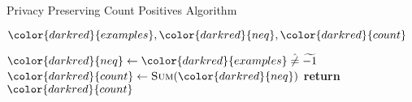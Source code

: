 \begin{algorithm}[H]
\caption{Privacy Preserving Count Positives Algorithm}\label{a:id3-count-positives-pp}
\begin{algorithmic}[1]
\Require ${\color{darkred}{examples}}, {\color{darkred}{neq}}, {\color{darkred}{count}}$

  \State ${\color{darkred}{neq}} \gets {\color{darkred}{examples}} \hneq \enc{-1}$
  \State ${\color{darkred}{count}} \gets \textsc{Sum}({\color{darkred}{neq}})$
  \State \textbf{return} ${\color{darkred}{count}}$
\EndProcedure
\end{algorithmic}
\end{algorithm}
